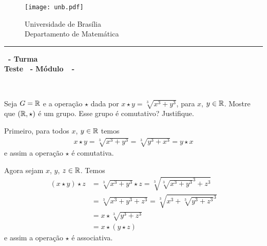 \documentclass[12pt]{exam}
\begin{document}
    \begin{figure}[h]
        \begin{minipage}[c]{1.7cm}
            \texttt{[image: unb.pdf]}
        \end{minipage}
        \hspace{0pt}
        \begin{minipage}[c]{4in}
            {Universidade de Brasília} \\
            {Departamento de Matemática}
        \end{minipage}
    \end{figure}
    \hrule
    \begin{center}
        {\Large\bf \disciplina\ - Turma \turma}  \\
         {\large\bf Teste \numeroteste\ - Módulo\ \modulo\ -\ \dataavaliacao}
    \end{center}

    \\
    \vspace*{.01cm}


    \vspace{.6cm}


    \questao Seja $G = \mathbb{R}$ e a operação $\star$ dada por $x \star y = \sqrt[3]{x^3 + y^3}$, para $x$, $y \in \mathbb{R}$. Mostre que $(\mathbb{R}, \star)$ é um grupo. Esse grupo é comutativo? Justifique.

    \noindent\solucao Primeiro, para todos $x$, $y \in \mathbb{R}$ temos
    \begin{align*}
        x \star y = \sqrt[3]{x^3 + y^3} = \sqrt[3]{y^3 + x^3} = y \star x
    \end{align*}
    e assim a operação $\star$ é comutativa.

    Agora sejam $x$, $y$, $z \in \mathbb{R}$. Temos
    \begin{align*}
        (x\star y) \star z &= \sqrt[3]{x^3 + y^3} \star z = \sqrt[3]{\sqrt[3]{x^3 + y^3}^3 + z^3} \\ &= \sqrt[3]{x^3 + y^3 + z^3} = \sqrt[3]{x^3 + \sqrt[3]{y^3 + z^3}^3} \\ &= x \star \sqrt[3]{y^3 + z^3} \\ &= x \star (y \star z)
    \end{align*}
    e assim a operação $\star$ é associativa.
\end{document}
